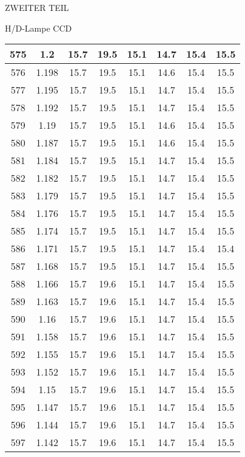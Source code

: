 \begin{appendix}
\begin{chapter}{ZWEITER TEIL}
\begin{section}{H/D-Lampe CCD}
\begin{scriptsize}
\begin{longtable}[htbp]{|c|c|c|c|c|c|c|c|}
            575 & 1.2 & 15.7 & 19.5 & 15.1 & 14.7 & 15.4 & 15.5 \\ \hline
            576 & 1.198 & 15.7 & 19.5 & 15.1 & 14.6 & 15.4 & 15.5 \\ \hline
            577 & 1.195 & 15.7 & 19.5 & 15.1 & 14.7 & 15.4 & 15.5 \\ \hline
            578 & 1.192 & 15.7 & 19.5 & 15.1 & 14.7 & 15.4 & 15.5 \\ \hline
            579 & 1.19 & 15.7 & 19.5 & 15.1 & 14.6 & 15.4 & 15.5 \\ \hline
            580 & 1.187 & 15.7 & 19.5 & 15.1 & 14.6 & 15.4 & 15.5 \\ \hline
            581 & 1.184 & 15.7 & 19.5 & 15.1 & 14.7 & 15.4 & 15.5 \\ \hline
            582 & 1.182 & 15.7 & 19.5 & 15.1 & 14.7 & 15.4 & 15.5 \\ \hline
            583 & 1.179 & 15.7 & 19.5 & 15.1 & 14.7 & 15.4 & 15.5 \\ \hline
            584 & 1.176 & 15.7 & 19.5 & 15.1 & 14.7 & 15.4 & 15.5 \\ \hline
            585 & 1.174 & 15.7 & 19.5 & 15.1 & 14.7 & 15.4 & 15.5 \\ \hline
            586 & 1.171 & 15.7 & 19.5 & 15.1 & 14.7 & 15.4 & 15.4 \\ \hline
            587 & 1.168 & 15.7 & 19.5 & 15.1 & 14.7 & 15.4 & 15.5 \\ \hline
            588 & 1.166 & 15.7 & 19.6 & 15.1 & 14.7 & 15.4 & 15.5 \\ \hline
            589 & 1.163 & 15.7 & 19.6 & 15.1 & 14.7 & 15.4 & 15.5 \\ \hline
            590 & 1.16 & 15.7 & 19.6 & 15.1 & 14.7 & 15.4 & 15.5 \\ \hline
            591 & 1.158 & 15.7 & 19.6 & 15.1 & 14.7 & 15.4 & 15.5 \\ \hline
            592 & 1.155 & 15.7 & 19.6 & 15.1 & 14.7 & 15.4 & 15.5 \\ \hline
            593 & 1.152 & 15.7 & 19.6 & 15.1 & 14.7 & 15.4 & 15.5 \\ \hline
            594 & 1.15 & 15.7 & 19.6 & 15.1 & 14.7 & 15.4 & 15.5 \\ \hline
            595 & 1.147 & 15.7 & 19.6 & 15.1 & 14.7 & 15.4 & 15.5 \\ \hline
            596 & 1.144 & 15.7 & 19.6 & 15.1 & 14.7 & 15.4 & 15.5 \\ \hline
            597 & 1.142 & 15.7 & 19.6 & 15.1 & 14.7 & 15.4 & 15.5 \\ \hline

\end{longtable}
\end{scriptsize}
\end{section}
\end{chapter}
\end{appendix}
